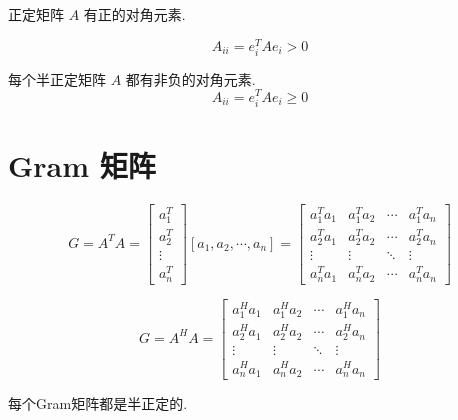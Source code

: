 \begin{theorem}[正定矩阵对角元素性质]
    正定矩阵 $ A $ 有正的对角元素.

    $$
A_{i i}=e_{i}^{T} A e_{i}>0
$$
\end{theorem}

\begin{theorem}[半正定矩阵对角元素性质]
    每个半正定矩阵 $ A $ 都有非负的对角元素.
$$
A_{i i}=e_{i}^{T} A e_{i} \geq 0
$$
\end{theorem}

\section{Gram 矩阵}

\begin{definition}
    \label{Def:Gram}

    $$ G=A^{T} A=\left[\begin{array}{c}a_{1}^{T} \\ a_{2}^{T} \\ \vdots \\ a_{n}^{T}\end{array}\right]\left[a_{1}, a_{2}, \cdots, a_{n}\right]=\left[\begin{array}{cccc}a_{1}^{T} a_{1} & a_{1}^{T} a_{2} & \cdots & a_{1}^{T} a_{n} \\ a_{2}^{T} a_{1} & a_{2}^{T} a_{2} & \cdots & a_{2}^{T} a_{n} \\ \vdots & \vdots & \ddots & \vdots \\ a_{n}^{T} a_{1} & a_{n}^{T} a_{2} & \cdots & a_{n}^{T} a_{n}\end{array}\right] $$
\end{definition}

\begin{definition}
    $$ G=A^{H} A=\left[\begin{array}{cccc}a_{1}^{H} a_{1} & a_{1}^{H} a_{2} & \cdots & a_{1}^{H} a_{n} \\ a_{2}^{H} a_{1} & a_{2}^{H} a_{2} & \cdots & a_{2}^{H} a_{n} \\ \vdots & \vdots & \ddots & \vdots \\ a_{n}^{H} a_{1} & a_{n}^{H} a_{2} & \cdots & a_{n}^{H} a_{n}\end{array}\right] $$
\end{definition}

\begin{theorem}
    每个Gram矩阵都是半正定的.
\end{theorem}

